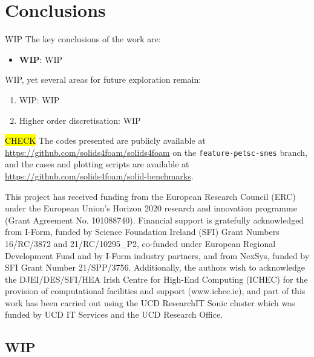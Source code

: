 \documentclass[sn-mathphys,Numbered]{sn-jnl}%
\begin{document}
\section{Conclusions} \label{sec:conclusion}
WIP
The key conclusions of the work are:
\begin{itemize}
	\item \textbf{WIP}: WIP
\end{itemize}



WIP, yet several areas for future exploration remain:
\begin{enumerate}
	\item{WIP}: WIP
	
	\item{Higher order discretisation}: WIP
\end{enumerate}



\backmatter

\hl{CHECK}
The codes presented are publicly available at \url{https://github.com/solids4foam/solids4foam} on the \texttt{feature-petsc-snes} branch, and the cases and plotting scripts are available at \url{https://github.com/solids4foam/solid-benchmarks}.


This project has received funding from the European Research Council (ERC) under the European Union’s Horizon 2020 research and innovation programme (Grant Agreement No. 101088740).
Financial support is gratefully acknowledged from I-Form, funded by Science Foundation Ireland (SFI) Grant Numbers {16/RC/3872} and {21/RC/10295\_P2}, co-funded under European Regional Development Fund and by I-Form industry partners, and from NexSys, funded by SFI Grant Number 21/SPP/3756.
Additionally, the authors wish to acknowledge the DJEI/DES/SFI/HEA Irish Centre for High-End Computing (ICHEC) for the provision of computational facilities and support (www.ichec.ie), and part of this work has been carried out using the UCD ResearchIT Sonic cluster which was funded by UCD IT Services and the UCD Research Office.



\newpage

\begin{appendices}

\section{WIP}
\label{app:WIP}



\end{appendices}


\end{document}
